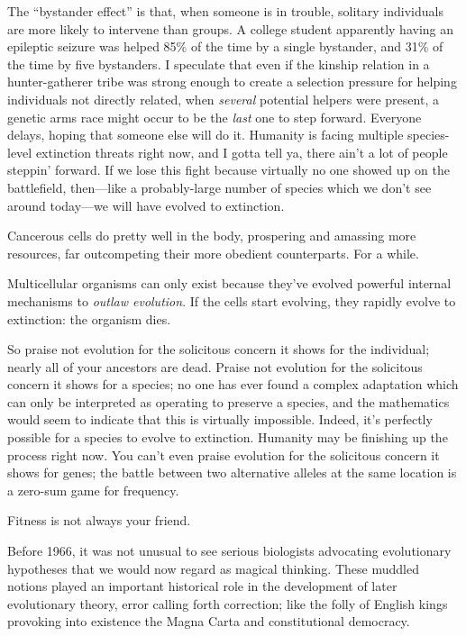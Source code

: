  The ``bystander effect'' is
that, when someone is in trouble, solitary individuals are more likely
to intervene than groups. A college student apparently having an
epileptic seizure was helped 85\% of the time by a single bystander,
and 31\% of the time by five bystanders. I speculate that even if the
kinship relation in a hunter-gatherer tribe was strong enough to create
a selection pressure for helping individuals not directly related, when
\textit{several} potential helpers were present, a genetic arms race
might occur to be the \textit{last} one to step forward. Everyone
delays, hoping that someone else will do it. Humanity is facing
multiple species-level extinction threats right now, and I gotta tell
ya, there ain't a lot of people
steppin' forward. If we lose this fight because
virtually no one showed up on the battlefield, then---like a
probably-large number of species which we don't see
around today---we will have evolved to extinction.


 Cancerous cells do pretty well in the body, prospering and
amassing more resources, far outcompeting their more obedient
counterparts. For a while.


 Multicellular organisms can only exist because
they've evolved powerful internal mechanisms to
\textit{outlaw evolution}. If the cells start evolving, they rapidly
evolve to extinction: the organism dies.


 So praise not evolution for the solicitous concern it shows for
the individual; nearly all of your ancestors are dead. Praise not
evolution for the solicitous concern it shows for a species; no one has
ever found a complex adaptation which can only be interpreted as
operating to preserve a species, and the mathematics would seem to
indicate that this is virtually impossible. Indeed,
it's perfectly possible for a species to evolve to
extinction. Humanity may be finishing up the process right now. You
can't even praise evolution for the solicitous concern
it shows for genes; the battle between two alternative alleles at the
same location is a zero-sum game for frequency.


 Fitness is not always your friend.

\myendsectiontext



 Before 1966, it was not unusual to see serious biologists
advocating evolutionary hypotheses that we would now regard as magical
thinking. These muddled notions played an important historical role in
the development of later evolutionary theory, error calling forth
correction; like the folly of English kings provoking into existence
the Magna Carta and constitutional democracy. 


